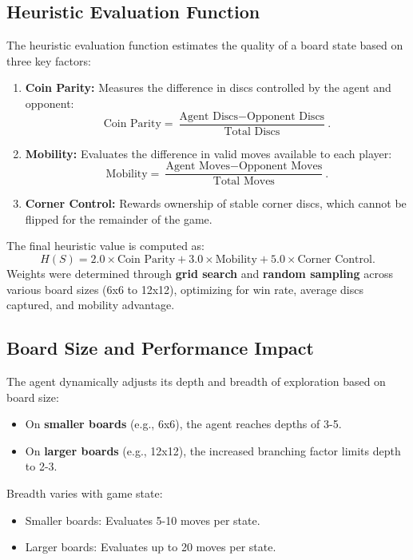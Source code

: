 \documentclass[11pt]{article}
\begin{document}
\subsection*{Heuristic Evaluation Function}
The heuristic evaluation function estimates the quality of a board state based on three key factors:
\begin{enumerate}
    \item \textbf{Coin Parity:} Measures the difference in discs controlled by the agent and opponent:
    \[
    \text{Coin Parity} = \frac{\text{Agent Discs} - \text{Opponent Discs}}{\text{Total Discs}}.
    \]
    \item \textbf{Mobility:} Evaluates the difference in valid moves available to each player:
    \[
    \text{Mobility} = \frac{\text{Agent Moves} - \text{Opponent Moves}}{\text{Total Moves}}.
    \]
    \item \textbf{Corner Control:} Rewards ownership of stable corner discs, which cannot be flipped for the remainder of the game.
\end{enumerate}

\noindent The final heuristic value is computed as:
\[
H(S) = 2.0 \times \text{Coin Parity} + 3.0 \times \text{Mobility} + 5.0 \times \text{Corner Control}.
\]
Weights were determined through \textbf{grid search} and \textbf{random sampling} across various board sizes (6x6 to 12x12), optimizing for win rate, average discs captured, and mobility advantage.

\subsection*{Board Size and Performance Impact}
\noindent The agent dynamically adjusts its depth and breadth of exploration based on board size:
\begin{itemize}
    \item On \textbf{smaller boards} (e.g., 6x6), the agent reaches depths of 3-5.
    \item On \textbf{larger boards} (e.g., 12x12), the increased branching factor limits depth to 2-3.
\end{itemize}

\noindent Breadth varies with game state:
\begin{itemize}
    \item Smaller boards: Evaluates 5-10 moves per state.
    \item Larger boards: Evaluates up to 20 moves per state.
\end{itemize}
\end{document}
